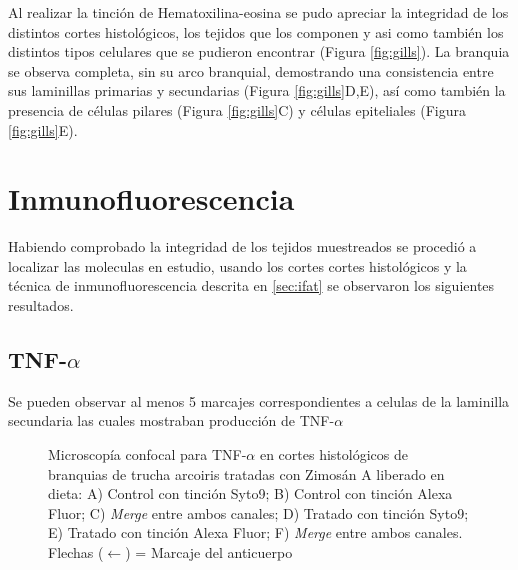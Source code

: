 \documentclass[12pt,letterpaper,oneside]{scrbook}
\begin{document}
Al realizar la tinción de Hematoxilina-eosina se pudo apreciar la
integridad de los distintos cortes histológicos, los tejidos que los
componen y asi como también los distintos tipos celulares que se
pudieron encontrar (Figura \ref{fig:gills}). La branquia se observa
completa, sin su arco branquial, demostrando una consistencia entre sus
laminillas primarias y secundarias (Figura \ref{fig:gills}D,E), así como
también la presencia de células pilares (Figura \ref{fig:gills}C) y
células epiteliales (Figura \ref{fig:gills}E).

\section{Inmunofluorescencia}

Habiendo comprobado la integridad de los tejidos muestreados se procedió
a localizar las moleculas en estudio, usando los cortes cortes
histológicos y la técnica de inmunofluorescencia descrita en
\ref{sec:ifat} se observaron los siguientes resultados.

\subsection{TNF-$\alpha$}

Se pueden observar al menos 5 marcajes correspondientes a celulas de la
laminilla secundaria las cuales mostraban producción de TNF-\(\alpha\)

\begin{figure}[h!]
    \centering
    \caption[Microscopía Confocal para TNF-$\alpha$]{Microscopía confocal para TNF-$\alpha$ en cortes histológicos de branquias de trucha arcoiris tratadas con Zimosán A liberado en dieta: A) Control con tinción Syto9; B) Control con tinción Alexa Fluor; C) \emph{Merge} entre ambos canales; D) Tratado con tinción Syto9; E) Tratado con tinción Alexa Fluor; F) \emph{Merge} entre ambos canales.  Flechas ($\leftarrow$) = Marcaje del anticuerpo}
    \label {fig:gills:tnfa}
\end{figure}
\end{document}
